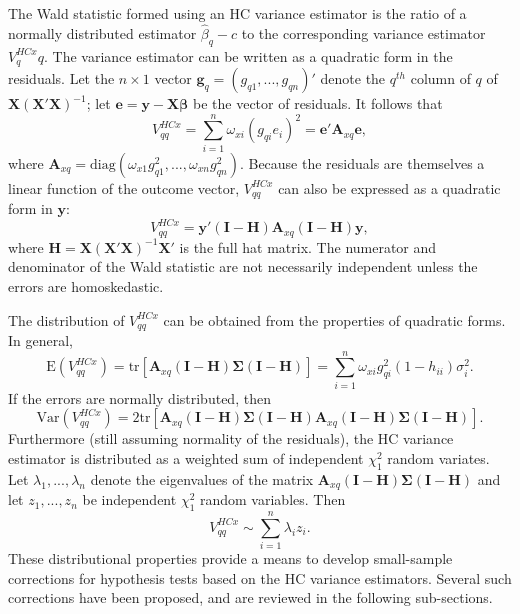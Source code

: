 \documentclass{article}\usepackage[]{graphicx}\usepackage[]{color}
\newcommand{\E}{\text{E}}
\newcommand{\Var}{\text{Var}}
\newcommand{\tr}{\text{tr}}
\newcommand{\diag}{\text{diag}}
\newcommand{\bm}{\mathbf}
\newcommand{\bs}{\boldsymbol}
\begin{document}
The Wald statistic formed using an HC variance estimator is the ratio of a normally distributed estimator $\hat\beta_q - c$ to the corresponding variance estimator $V^{HCx}_qq$. The variance estimator can be written as a quadratic form in the residuals. Let the $n \times 1$ vector $\bm{g}_q = (g_{q1},...,g_{qn})'$ denote the $q^{th}$ column of $q$ of $\bm{X}\left(\bm{X}'\bm{X}\right)^{-1}$; let $\bm{e} = \bm{y} - \bm{X}\bs\beta$ be the vector of residuals. It follows that 
\begin{equation}
V^{HCx}_{qq} = \sum_{i=1}^n \omega_{xi} \left(g_{qi} e_i\right)^2 = \bm{e}' \bm{A}_{xq} \bm{e},
\end{equation}
where $\bm{A}_{xq} = \diag\left(\omega_{x1} g_{q1}^2, ..., \omega_{xn} g_{qn}^2\right)$. Because the residuals are themselves a linear function of the outcome vector, $V^{HCx}_{qq}$ can also be expressed as a quadratic form in $\bm{y}$: 
\[
V^{HCx}_{qq} = \bm{y}'\left(\bm{I} - \bm{H}\right) \bm{A}_{xq} \left(\bm{I} - \bm{H}\right) \bm{y}, \]
where $\bm{H} = \bm{X}\left(\bm{X}'\bm{X}\right)^{-1} \bm{X}'$ is the full hat matrix. The numerator and denominator of the Wald statistic are not necessarily independent unless the errors are homoskedastic. 

The distribution of $V^{HCx}_{qq}$ can be obtained from the properties of quadratic forms. In general, \[
\E\left(V^{HCx}_{qq}\right) = \tr\left[\bm{A}_{xq} \left(\bm{I} - \bm{H}\right)\bs\Sigma\left(\bm{I} - \bm{H}\right) \right] = \sum_{i=1}^n \omega_{xi} g_{qi}^2 (1 - h_{ii}) \sigma_i^2. \]
If the errors are normally distributed, then \[
\Var\left(V^{HCx}_{qq}\right) = 2\tr\left[\bm{A}_{xq} \left(\bm{I} - \bm{H}\right)\bs\Sigma\left(\bm{I} - \bm{H}\right) \bm{A}_{xq} \left(\bm{I} - \bm{H}\right)\bs\Sigma\left(\bm{I} - \bm{H}\right)\right]. \]
Furthermore (still assuming normality of the residuals), the HC variance estimator is distributed as a weighted sum of independent $\chi^2_1$ random variates. Let $\lambda_1,...,\lambda_n$ denote the eigenvalues of the matrix $\bm{A}_{xq} \left(\bm{I} - \bm{H}\right)\bs\Sigma\left(\bm{I} - \bm{H}\right)$ and let $z_1,...,z_n$ be independent $\chi^2_1$ random variables. Then 
\begin{equation}
\label{eq:quadratic_dist}
V^{HCx}_{qq} \sim \sum_{i=1}^n \lambda_i z_i.
\end{equation}
These distributional properties provide a means to develop small-sample corrections for hypothesis tests based on the HC variance estimators. Several such corrections have been proposed, and are reviewed in the following sub-sections. 
\end{document}

